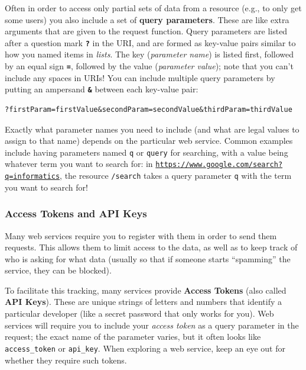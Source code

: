 \documentclass[]{book}
\theoremstyle{definition}
\theoremstyle{definition}
\theoremstyle{remark}
\begin{document}
Often in order to access only partial sets of data from a resource
(e.g., to only get some users) you also include a set of \textbf{query
parameters}. These are like extra arguments that are given to the
request function. Query parameters are listed after a question mark
\textbf{\texttt{?}} in the URI, and are formed as key-value pairs
similar to how you named items in \emph{lists}. The key (\emph{parameter
name}) is listed first, followed by an equal sign \textbf{\texttt{=}},
followed by the value (\emph{parameter value}); note that you can't
include any spaces in URIs! You can include multiple query parameters by
putting an ampersand \textbf{\texttt{\&}} between each key-value pair:

\begin{verbatim}
?firstParam=firstValue&secondParam=secondValue&thirdParam=thirdValue
\end{verbatim}

Exactly what parameter names you need to include (and what are legal
values to assign to that name) depends on the particular web service.
Common examples include having parameters named \texttt{q} or
\texttt{query} for searching, with a value being whatever term you want
to search for: in
\href{https://www.google.com/search?q=informatics}{\texttt{https://www.google.com/search?q=informatics}},
the resource \texttt{/search} takes a query parameter \texttt{q} with
the term you want to search for!

\subsubsection{Access Tokens and API
Keys}\label{access-tokens-and-api-keys}

Many web services require you to register with them in order to send
them requests. This allows them to limit access to the data, as well as
to keep track of who is asking for what data (usually so that if someone
starts ``spamming'' the service, they can be blocked).

To facilitate this tracking, many services provide \textbf{Access
Tokens} (also called \textbf{API Keys}). These are unique strings of
letters and numbers that identify a particular developer (like a secret
password that only works for you). Web services will require you to
include your \emph{access token} as a query parameter in the request;
the exact name of the parameter varies, but it often looks like
\texttt{access\_token} or \texttt{api\_key}. When exploring a web
service, keep an eye out for whether they require such tokens.
\end{document}

